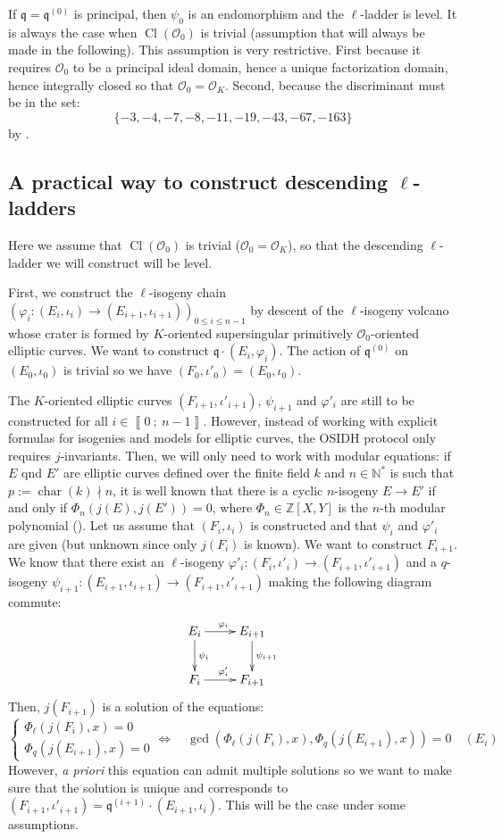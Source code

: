 \documentclass[a4paper,10pt]{report}
\theoremstyle{definition}
\theoremstyle{plain}
\theoremstyle{definition}
\newcommand{\N}{\mathbb{N}}
\newcommand{\Z}{\mathbb{Z}}
\newcommand{\mO}{\mathcal{O}}
\renewcommand{\i}[2]{\left\llbracket #1~;~#2\right\rrbracket}
\renewcommand{\(}{\left(}
\renewcommand{\)}{\right)}
\newcommand{\mf}[1]{\mathfrak{#1}}
\newcommand{\mfq}{\mathfrak{q}}
\DeclareMathOperator{\Cl}{Cl}
\DeclareMathOperator{\Char}{char}%
\begin{document}
If $\mfq=\mfq^{(0)}$ is principal, then $\psi_0$ is an endomorphism and the $\ell$-ladder is level. It is always the case when $\Cl(\mO_0)$ is trivial (assumption that will always be made in the following). This assumption is very restrictive. First because it requires $\mO_0$ to be a principal ideal domain, hence a unique factorization domain, hence integrally closed so that $\mO_0=\mO_K$. Second, because the discriminant must be in the set:
\[\{-3,-4,-7,-8,-11,-19,-43,-67,-163\}\]
by \cite[theorem 7.30.(i)]{Cox}.


\subsection{A practical way to construct descending $\ell$-ladders}\label{paragraph 1}

Here we assume that $\Cl(\mO_0)$ is trivial ($\mO_0=\mO_K$), so that the descending $\ell$-ladder we will construct will be level.

First, we construct the $\ell$-isogeny chain $(\varphi_i: (E_i,\iota_i)\longrightarrow (E_{i+1},\iota_{i+1}))_{0\leq i\leq n-1}$ by descent of the $\ell$-isogeny volcano whose crater is formed by $K$-oriented supersingular primitively $\mO_0$-oriented elliptic curves.  We want to construct $\mf{q}\cdot(E_i,\varphi_i)$.  The action of $\mfq^{(0)}$ on $(E_0,\iota_0)$ is trivial so we have $(F_0,\iota'_0)=(E_0,\iota_0)$. 

The $K$-oriented elliptic curves $(F_{i+1},\iota'_{i+1})$, $\psi_{i+1}$ and $\varphi'_i$ are still to be constructed for all $i\in\i{0}{n-1}$. However, instead of working with explicit formulas for isogenies and models for elliptic curves, the OSIDH protocol only requires $j$-invariants. Then, we will only need to work with modular equations: if $E$ qnd $E'$ are elliptic curves defined over the finite field $k$ and $n\in\N^*$ is such that $p:=\Char(k)\nmid n$, it is well known that there is a cyclic $n$-isogeny $E\longrightarrow E'$ if and only if $\Phi_n(j(E),j(E'))=0$, where $\Phi_n\in\Z[X,Y]$ is the $n$-th modular polynomial (\cite[theorem V.5]{Lang_EF}). Let us assume that $(F_i,\iota_i)$ is constructed and that $\psi_i$ and $\varphi'_i$ are given (but unknown since only $j(F_i)$ is known).  We want to construct $F_{i+1}$. We know that there exist an $\ell$-isogeny $\varphi'_i: (F_i,\iota'_i)\longrightarrow (F_{i+1},\iota'_{i+1})$ and a $q$-isogeny $\psi_{i+1}: (E_{i+1},\iota_{i+1})\longrightarrow (F_{i+1},\iota'_{i+1})$ making the following diagram commute:
\[\xymatrix{
E_i \ar[d]^{\psi_i} \ar[r]^{\varphi_i} & E_{i+1}\ar[d]^{\psi_{i+1}} \\
F_i \ar[r]^{\varphi'_i} & F_{i+1}
}\]
Then, $j(F_{i+1})$ is a solution of the equations:
\[\left\{\begin{array}{c}
\Phi_\ell(j(F_i),x)=0\\
\Phi_q(j(E_{i+1}),x)=0
\end{array}\right. \Longleftrightarrow \quad \gcd(\Phi_\ell(j(F_i),x),\Phi_q(j(E_{i+1}),x))=0\quad (E_i)\]
However, \emph{a priori} this equation can admit multiple solutions so we want to make sure that the solution is unique and corresponds to $(F_{i+1},\iota'_{i+1})=\mf{q}^{(i+1)}\cdot(E_{i+1},\iota_i)$. This will be the case under some assumptions.
\end{document}
